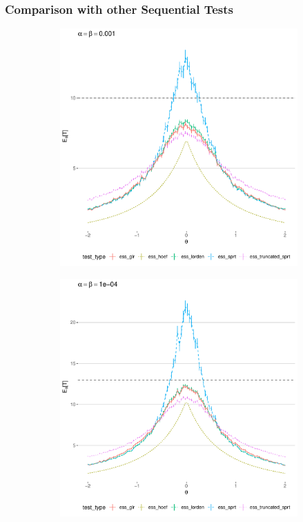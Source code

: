 \documentclass[10pt]{beamer}
\begin{document}
\begin{frame}
\end{frame}

\begin{frame}
\frametitle{Comparison with other Sequential Tests}

\begin{figure}
\centering
\begin{subfigure}{0.49\textwidth}
    \includegraphics[width=\textwidth]{images/ess_alpha1e3}
\end{subfigure}
\hfill
\begin{subfigure}{0.49\textwidth}
    \includegraphics[width=\textwidth]{images/ess_alpha1e4}
\end{subfigure}
\end{figure}
\end{frame}
\end{document}
